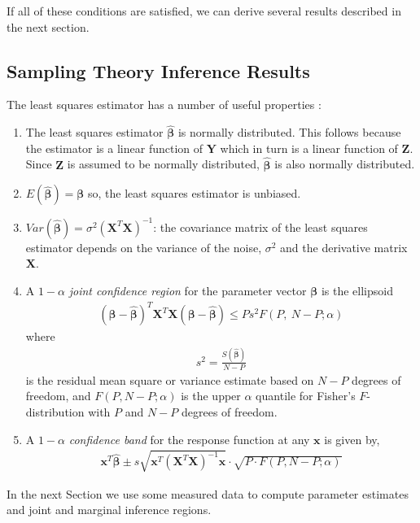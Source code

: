 \documentclass[11pt,a4paper]{article}
\begin{document}
If all of these conditions are satisfied, we can derive several results
described in the next section.

\subsection{Sampling Theory Inference
Results}\label{sampling-theory-inference-results}
The least squares estimator has a number of useful properties \cite{seber1977}:

\begin{enumerate}
\def\labelenumi{\arabic{enumi}.}
\item
  The least squares estimator \(\widehat{\boldsymbol{\beta}}\) is normally
  distributed. This follows because the estimator is a linear function
  of \(\boldsymbol{Y}\) which in turn is a linear function of
  \(\boldsymbol{Z}\). Since \(\boldsymbol{Z}\) is assumed to be normally
  distributed, \(\widehat{\boldsymbol{\beta}}\) is also normally
  distributed.
\item
  \(E\left( \widehat{\boldsymbol{\beta}} \right) = \boldsymbol{\beta}\) so, the
  least squares estimator is unbiased.
\item
  \(Var\left( \widehat{\boldsymbol{\beta}} \right) = \sigma^{2}\left( \boldsymbol{X}^{T}\boldsymbol{X} \right)^{- 1}\):
  the covariance matrix of the least squares estimator depends on the
  variance of the noise, \(\sigma^{2}\) and the derivative matrix
  \(\boldsymbol{X}\).
\item
A \(1-\alpha\) \emph{joint confidence region} for the parameter vector \(\boldsymbol{\beta}\) is the ellipsoid
\begin{align}
\left( \boldsymbol{\beta} - \widehat{\boldsymbol{\beta}} \right)^{T}\boldsymbol{X}^{T}\boldsymbol{X}\left( \boldsymbol{\beta} - \widehat{\boldsymbol{\beta}} \right) \leq Ps^{2}F(P,\ N - P;\alpha)
\end{align}
where
\begin{align}
s^2 = \frac{S(\widehat{\boldsymbol{\beta}})}{N-P}
\end{align}
is the residual mean square or variance estimate based on \(N-P\) degrees of freedom, 
and \(F(P, N-P; \alpha)\) is the upper \(\alpha\) quantile for Fisher’s \(F\)-distribution with \(P\) and \(N-P\) degrees of freedom.
\item
A \(1-\alpha\) \emph{confidence band} for the response function at any \(\boldsymbol{x}\) is given by,
\begin{align}
\boldsymbol{x}^{T}\widehat{\boldsymbol{\beta}} \pm s\sqrt{\boldsymbol{x}^{T}\left( \boldsymbol{X}^{T}\boldsymbol{X} \right)^{- 1}\boldsymbol{x}} \cdot \sqrt{P \cdot F(P,N - P;\alpha)}
\end{align}
\end{enumerate}
In the next Section we use some measured data to compute parameter
estimates and joint and marginal inference regions.
\end{document}
